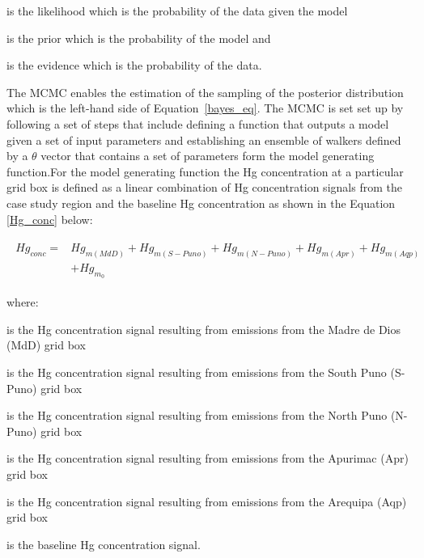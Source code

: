 \begin{description}[leftmargin=!,labelwidth={3 em}]
    \item [$P(D|\theta)$] is the likelihood which is the probability of the data given the model
    \item [$P(\theta)$] is the prior which is the probability of the model and 
    \item [$P(D)$] is the evidence which is the probability of the data.
\end{description}

\begin{flushleft}
The MCMC enables the estimation of the sampling of the posterior distribution which is the left-hand side of Equation~\ref{bayes_eq}. The MCMC is set set up by following a set of steps that include defining a function that outputs a model given a set of input parameters and establishing an ensemble of walkers defined by a $\theta$ vector that contains a set of parameters form the model generating function.For the model generating function the Hg concentration at a particular grid box is defined as a linear combination of Hg concentration signals from the case study region and the baseline Hg concentration as shown in the Equation \ref{Hg_conc} below:

\begin{align}
\begin{split}\label{Hg_conc}
Hg_{conc}= {}&Hg_{m(MdD)}+ Hg_{m(S-Puno)} + Hg_{m(N-Puno)} + Hg_{m(Apr)}+ Hg_{m(Aqp)}\\
            & +Hg_{m_0}
\end{split}
\end{align}

where:
\end{flushleft}

\begin{description}[leftmargin=!,labelwidth={5 em}]
    \item [$Hg_{m(MdD)}$] is the Hg concentration signal resulting from emissions from the Madre de Dios (MdD) grid box
    \item [$Hg_{m(S-Puno)}$] is the Hg concentration signal resulting from emissions from the South Puno (S-Puno) grid box
    \item [$Hg_{m(N-Puno)}$] is the Hg concentration signal resulting from emissions from the North Puno (N-Puno) grid box
    \item [$Hg_{m(Apr)}$] is the Hg concentration signal resulting from emissions from the Apurimac (Apr) grid box
    \item [$Hg_{m(Aqp)}$] is the Hg concentration signal resulting from emissions from the Arequipa (Aqp) grid box
    \item [$Hg_{m_0}$] is the baseline Hg concentration signal.
\end{description}

